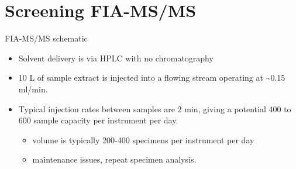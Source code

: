 \documentclass[presentation, smaller]{beamer}
\begin{document}
\section{Screening FIA-MS/MS}
\label{sec:orgheadline14}
\begin{frame}[label={sec:orgheadline8}]{FIA-MS/MS schematic}
\begin{center}
\end{center}

\begin{itemize}
\item Solvent delivery is via HPLC with no chromatography
\item 10 \textmu{}L of sample extract is injected into a flowing stream operating at \textasciitilde{}0.15 ml/min.

\item Typical injection rates between samples are 2 min, giving a potential 400
to 600 sample capacity per instrument per day.
\begin{itemize}
\item volume is typically 200-400 specimens per instrument per day
\item maintenance issues, repeat specimen analysis.
\end{itemize}
\end{itemize}
\end{frame}
\end{document}
